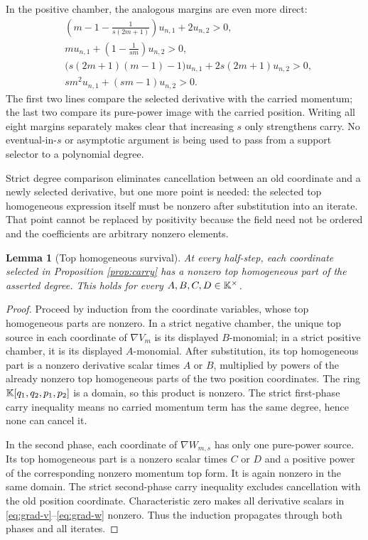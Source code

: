 \documentclass[11pt]{article}
\newtheorem{lemma}[theorem]{Lemma}
\theoremstyle{definition}
\theoremstyle{remark}
\begin{document}
In the positive chamber, the analogous margins are even more direct:
\begin{align*}
&\left(m-1-\frac1{s(2m+1)}\right)u_{n,1}+2u_{n,2}>0,\\
&mu_{n,1}+\left(1-\frac1{sm}\right)u_{n,2}>0,\\
&\bigl(s(2m+1)(m-1)-1\bigr)u_{n,1}
  +2s(2m+1)u_{n,2}>0,\\
&sm^2u_{n,1}+(sm-1)u_{n,2}>0.
\end{align*}
The first two lines compare the selected derivative with the carried
momentum; the last two compare its pure-power image with the carried
position.  Writing all eight margins separately makes clear that increasing
\(s\) only strengthens carry.  No eventual-in-\(s\) or asymptotic argument
is being used to pass from a support selector to a polynomial degree.

Strict degree comparison eliminates cancellation between an old coordinate
and a newly selected derivative, but one more point is needed: the selected
top homogeneous expression itself must be nonzero after substitution into an
iterate.  That point cannot be replaced by positivity because the field need
not be ordered and the coefficients are arbitrary nonzero elements.

\begin{lemma}[Top homogeneous survival]
\label{lem:top-survival}
At every half-step, each coordinate selected in Proposition
\ref{prop:carry} has a nonzero top homogeneous part of the asserted degree.
This holds for every \(A,B,C,D\in\mathbb{K}^\times\).
\end{lemma}

\begin{proof}
Proceed by induction from the coordinate variables, whose top homogeneous
parts are nonzero.  In a strict negative chamber, the unique top source in
each coordinate of \(\nabla V_m\) is its displayed \(B\)-monomial; in a
strict positive chamber, it is its displayed \(A\)-monomial.  After
substitution, its top homogeneous part is a nonzero derivative scalar times
\(A\) or \(B\), multiplied by powers of the already nonzero top homogeneous
parts of the two position coordinates.  The ring
\(\mathbb{K}[q_1,q_2,p_1,p_2]\) is a domain, so this product is nonzero.  The
strict first-phase carry inequality means no carried momentum term has the
same degree, hence none can cancel it.

In the second phase, each coordinate of \(\nabla W_{m,s}\) has only one
pure-power source.  Its top homogeneous part is a nonzero scalar times
\(C\) or \(D\) and a positive power of the corresponding nonzero momentum
top form.  It is again nonzero in the same domain.  The strict second-phase
carry inequality excludes cancellation with the old position coordinate.
Characteristic zero makes all derivative scalars in
\eqref{eq:grad-v}--\eqref{eq:grad-w} nonzero.  Thus the induction propagates
through both phases and all iterates.
\end{proof}
\end{document}
